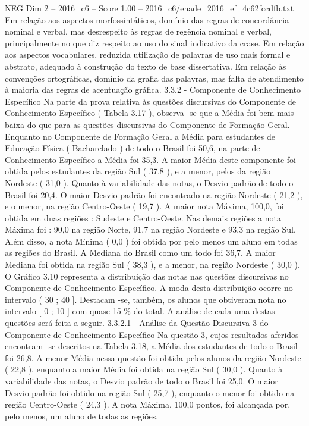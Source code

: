 \begin{textsample}{NEG Dim 2 – 2016\_c6 – Score 1.00 – 2016\_c6/enade\_2016\_ef\_4c62fccdfb.txt}
Em relação aos aspectos morfossintáticos, domínio das regras de concordância nominal e verbal, mas desrespeito às regras de regência nominal e verbal, principalmente no que diz respeito ao uso do sinal indicativo da crase.
Em relação aos aspectos vocabulares, reduzida utilização de palavras de uso mais formal e abstrato, adequado à construção do texto de base dissertativa.
Em relação às convenções ortográficas, domínio da grafia das palavras, mas falta de atendimento à maioria das regras de acentuação gráfica. 3.3.2 - Componente de Conhecimento Específico Na parte da prova relativa às questões discursivas do Componente de Conhecimento Específico ( Tabela 3.17 ), observa -se que a Média foi bem mais baixa do que para as questões discursivas do Componente de Formação Geral.
Enquanto no Componente de Formação Geral a Média para estudantes de Educação Física ( Bacharelado ) de todo o Brasil foi 50,6, na parte de Conhecimento Específico a Média foi 35,3.
A maior Média deste componente foi obtida pelos estudantes da região Sul ( 37,8 ), e a menor, pelos da região Nordeste ( 31,0 ).
Quanto à variabilidade das notas, o Desvio padrão de todo o Brasil foi 20,4.
O maior Desvio padrão foi encontrado na região Nordeste ( 21,2 ), e o menor, na região Centro-Oeste ( 19,7 ).
A maior nota Máxima, 100,0, foi obtida em duas regiões : Sudeste e Centro-Oeste.
Nas demais regiões a nota Máxima foi : 90,0 na região Norte, 91,7 na região Nordeste e 93,3 na região Sul.
Além disso, a nota Mínima ( 0,0 ) foi obtida por pelo menos um aluno em todas as regiões do Brasil.
A Mediana do Brasil como um todo foi 36,7.
A maior Mediana foi obtida na região Sul ( 38,3 ), e a menor, na região Nordeste ( 30,0 ).
O Gráfico 3.10 representa a distribuição das notas nas questões discursivas no Componente de Conhecimento Específico.
A moda desta distribuição ocorre no intervalo ( 30 ; 40 ].
Destacam -se, também, os alunos que obtiveram nota no intervalo [ 0 ; 10 ] com quase 15 \% do total.
A análise de cada uma destas questões será feita a seguir. 3.3.2.1 - Análise da Questão Discursiva 3 do Componente de Conhecimento Específico Na questão 3, cujos resultados aferidos encontram -se descritos na Tabela 3.18, a Média dos estudantes de todo o Brasil foi 26,8.
A menor Média nessa questão foi obtida pelos alunos da região Nordeste ( 22,8 ), enquanto a maior Média foi obtida na região Sul ( 30,0 ).
Quanto à variabilidade das notas, o Desvio padrão de todo o Brasil foi 25,0.
O maior Desvio padrão foi obtido na região Sul ( 25,7 ), enquanto o menor foi obtido na região Centro-Oeste ( 24,3 ).
A nota Máxima, 100,0 pontos, foi alcançada por, pelo menos, um aluno de todas as regiões.

\end{textsample}
